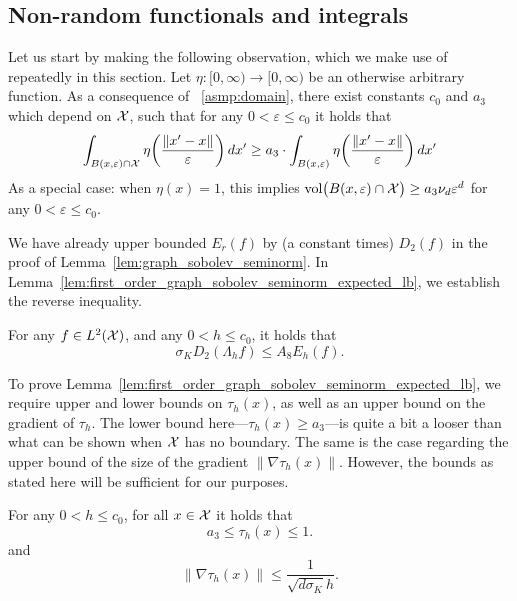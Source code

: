 \subsection{Non-random functionals and integrals}
\label{subsec:integrals}

Let us start by making the following observation, which we make use of repeatedly in this section. Let $\eta: [0,\infty) \to [0,\infty)$ be an otherwise arbitrary function. As a consequence of ~\ref{asmp:domain}, there exist constants $c_0$ and $a_3$ which depend on $\mathcal{X}$, such that for any $0 < \varepsilon \leq c_0$ it holds that 
\begin{equation}
\label{eqn:integral_boundary}
\int_{B(x,\varepsilon) \cap \mathcal{X}} \eta\biggl(\frac{\|x' - x\|}{\varepsilon}\biggr) \,dx' \geq a_3 \cdot \int_{B(x,\varepsilon)} \eta\biggl(\frac{\|x' - x\|}{\varepsilon}\biggr) \,dx'
\end{equation}
As a special case: when $\eta(x) = 1$, this implies $\text{vol}\bigl(B(x,\varepsilon) \cap \mathcal{X}\bigr) \geq a_3 \nu_d \varepsilon^d$ for any $0 < \varepsilon \leq c_0$.

We have already upper bounded $E_r(f)$ by (a constant times) $D_2(f)$ in the proof of Lemma~\ref{lem:graph_sobolev_seminorm}. In Lemma~\ref{lem:first_order_graph_sobolev_seminorm_expected_lb}, we establish the reverse inequality.
\begin{lemma}
	\label{lem:first_order_graph_sobolev_seminorm_expected_lb}
	For any $f \in L^2(\mathcal{X})$, and any $0 < h \leq c_0$, it holds that
	\begin{equation*}
	\sigma_KD_2(\Lambda_hf) \leq A_8 E_h(f).
	\end{equation*}
\end{lemma}

To prove Lemma~\ref{lem:first_order_graph_sobolev_seminorm_expected_lb}, we require upper and lower bounds on $\tau_h(x)$, as well as an upper bound on the gradient of $\tau_h$. The lower bound here---$\tau_h(x) \geq a_3$---is quite a bit a looser than what can be shown when $\mathcal{X}$ has no boundary. The same is the case regarding the upper bound of the size of the gradient $\|\nabla \tau_h(x)\|$. However, the bounds as stated here will be sufficient for our purposes.
\begin{lemma}
	\label{lem:tau_bound}
	For any $0 < h \leq c_0$, for all $x \in \mathcal{X}$ it holds that
	\begin{equation*}
	a_3 \leq \tau_h(x) \leq 1.
	\end{equation*}
	and 
	\begin{equation*}
	\|\nabla \tau_h(x)\| \leq \frac{1}{\sqrt{d\sigma_K} h}.
	\end{equation*}
\end{lemma}

